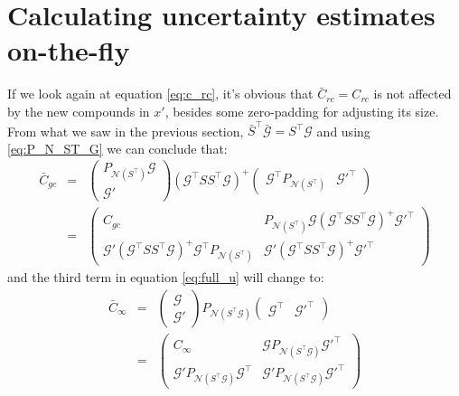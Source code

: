 \documentclass[11pt]{article}
\newcommand{\Gmat}{\mathcal{G}}
\newcommand{\PNmat}[1]{P_{\mathcal{N}\left(#1\right)}}
\begin{document}
\section{Calculating uncertainty estimates on-the-fly}
If we look again at equation \ref{eq:c_rc}, it's obvious that $\bar{C}_{rc} = C_{rc}$ is not affected by the new compounds in $x'$, besides some zero-padding for adjusting its size. From what we saw in the previous section, $\bar{S}^\top \bar{\Gmat} = S^\top \Gmat$ and using \ref{eq:P_N_ST_G} we can conclude that:
\begin{eqnarray}
	\bar{C}_{gc} &=& \left( \begin{array}{c} \PNmat{S^\top} \Gmat \\ \hline \Gmat' \end{array} \right)
	\left(\Gmat^{\top}SS^{\top}\Gmat\right)^{+} 
	\left( \begin{array}{c|c} \Gmat^\top \PNmat{S^\top} & \Gmat'^\top \end{array} \right) 
\\
&=&
\left( \begin{array}{c|c} C_{gc} & \PNmat{S^\top} \Gmat \left(\Gmat^{\top}SS^{\top}\Gmat\right)^{+} \Gmat'^\top \\ \hline \Gmat' \left(\Gmat^{\top}SS^{\top}\Gmat\right)^{+} \Gmat^\top \PNmat{S^\top} & \Gmat'\left(\Gmat^{\top}SS^{\top}\Gmat\right)^{+} \Gmat'^\top \end{array} \right)
\end{eqnarray}
and the third term in equation \ref{eq:full_u} will change to:
\begin{eqnarray}
	\bar{C}_{\infty} &=& 
		\left(\begin{array}{c} \Gmat \\ \hline \Gmat' \end{array}\right)
		\PNmat{S^\top\Gmat}
		\left(\begin{array}{c|c} \Gmat^\top & \Gmat'^\top \end{array}\right)
\\ &=&
	\left(\begin{array}{c|c}
		C_\infty &
		\Gmat \PNmat{S^\top\Gmat} \Gmat'^\top \\ \hline
		\Gmat' \PNmat{S^\top\Gmat} \Gmat^\top &
		\Gmat' \PNmat{S^\top\Gmat} \Gmat'^\top
 \end{array}\right)
\end{eqnarray}
\end{document}
